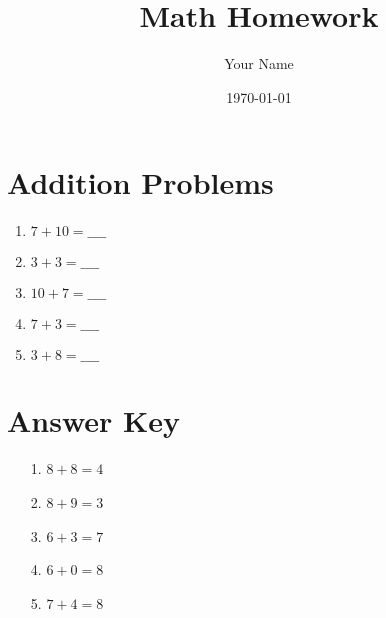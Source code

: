 \documentclass{article}
\title{Math Homework}
\author{Your Name}
\date{\today}
\begin{document}
\maketitle

\section*{Addition Problems}

\begin{enumerate}
    \item $7 + 10 = \_\_\_\_$
    \item $3 + 3 = \_\_\_\_$
    \item $10 + 7 = \_\_\_\_$
    \item $7 + 3 = \_\_\_\_$
    \item $3 + 8 = \_\_\_\_$
\end{enumerate}

\section*{Answer Key}
\begin{enumerate}
    \item[1.] $8 + 8 = 4$
    \item[2.] $8 + 9 = 3$
    \item[3.] $6 + 3 = 7$
    \item[4.] $6 + 0 = 8$
    \item[5.] $7 + 4 = 8$
\end{enumerate}
\end{document}
